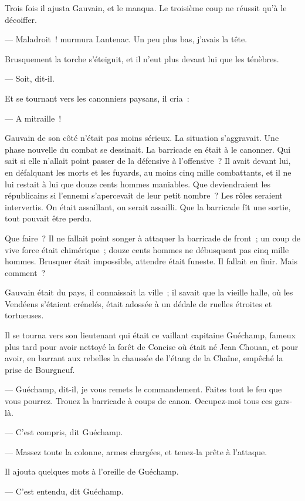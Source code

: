 \documentclass[french,twoside]{book} %
\begin{document}
Trois fois il ajusta Gauvain, et le manqua. Le troisième coup ne réussit qu’à le décoiffer.\par
 — Maladroit ! murmura Lantenac. Un peu plus bas, j’avais la tête.\par
Brusquement la torche s’éteignit, et il n’eut plus devant lui que les ténèbres.\par
— Soit, dit-il.\par
Et se tournant vers les canonniers paysans, il cria :\par
— A mitraille !\par
Gauvain de son côté n’était pas moins sérieux. La situation s’aggravait. Une phase nouvelle du combat se dessinait. La barricade en était à le canonner. Qui sait si elle n’allait point passer de la défensive à l’offensive ? Il avait devant lui, en défalquant les morts et les fuyards, au moins cinq mille combattants, et il ne lui restait à lui que douze cents hommes maniables. Que deviendraient les républicains si l’ennemi s’apercevait de leur petit nombre ? Les rôles seraient intervertis. On était assaillant, on serait assailli. Que la barricade fît une sortie, tout pouvait être perdu.\par
Que faire ? Il ne fallait point songer à attaquer la barricade de front ; un coup de vive force était chimérique ; douze cents hommes ne débusquent pas cinq mille hommes. Brusquer était impossible, attendre était funeste. Il fallait en finir. Mais comment ?\par
Gauvain était du pays, il connaissait la ville ; il savait que la vieille halle, où les Vendéens s’étaient crénelés, était adossée à un dédale de ruelles étroites et tortueuses.\par
Il se tourna vers son lieutenant qui était ce vaillant capitaine Guéchamp, fameux plus tard pour avoir nettoyé la forêt de Concise où était né Jean Chouan,  et pour avoir, en barrant aux rebelles la chaussée de l’étang de la Chaîne, empêché la prise de Bourgneuf.\par
— Guéchamp, dit-il, je vous remets le commandement. Faites tout le feu que vous pourrez. Trouez la barricade à coups de canon. Occupez-moi tous ces gars-là.\par
— C’est compris, dit Guéchamp.\par
— Massez toute la colonne, armes chargées, et tenez-la prête à l’attaque.\par
Il ajouta quelques mots à l’oreille de Guéchamp.\par
— C’est entendu, dit Guéchamp.\par
\end{document}
